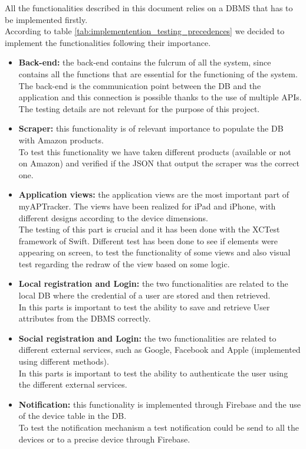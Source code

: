 All the functionalities described in this document relies on a DBMS that has to be implemented firstly.\\
According to table \ref{tab:implementention_testing_precedences} we decided to implement the functionalities following their importance.

\begin{itemize}
    \item \textbf{Back-end:} the back-end contains the fulcrum of all the system, since contains all the functions that are essential for the functioning of the system. The back-end is the communication point between the DB and the application and this connection is possible thanks to the use of multiple APIs.\\
    The testing details are not relevant for the purpose of this project.
    
    \item \textbf{Scraper:} this functionality is of relevant importance to populate the DB with Amazon products.\\
    To test this functionality we have taken different products (available or not on Amazon) and verified if the JSON that output the scraper was the correct one.
    
    \item \textbf{Application views:} the application views are the most important part of myAPTracker. The views have been realized for iPad and iPhone, with different designs according to the device dimensions.\\
    The testing of this part is crucial and it has been done with the XCTest framework of Swift. Different test has been done to see if elements were appearing on screen, to test the functionality of some views and also visual test regarding the redraw of the view based on some logic.

    \item \textbf{Local registration and Login:} the two functionalities are related to the local DB where the credential of a user are stored and then retrieved.\\
    In this parts is important to test the ability to save and retrieve User attributes from the DBMS correctly.
    
    \item \textbf{Social registration and Login:} the two functionalities are related to different external services, such as Google, Facebook and Apple (implemented using different methods).\\
    In this parts is important to test the ability to authenticate the user using the different external services.
    
    \item \textbf{Notification:} this functionality is implemented through Firebase and the use of the device table in the DB.\\
    To test the notification mechanism a test notification could be send to all the devices or to a precise device through Firebase.
\end{itemize}

